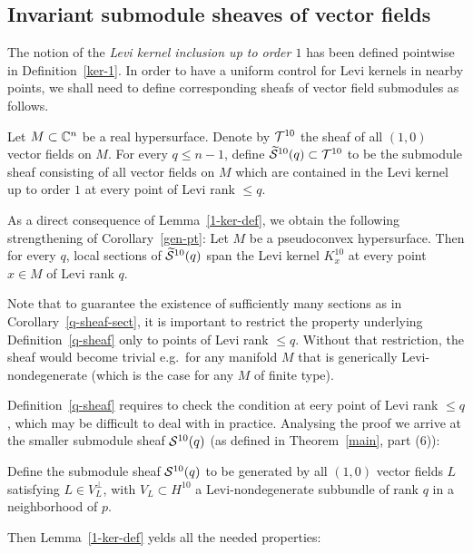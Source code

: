 \documentclass[12pt]{amsart}
\begin{document}
\subsection{Invariant submodule sheaves of vector fields}
The notion of the {\em Levi kernel inclusion up to order $1$} 
has been defined pointwise in Definition~\ref{ker-1}.
In order to have a uniform control for 
Levi kernels in nearby points,
we shall need to define
corresponding sheafs of vector field submodules as follows. 

\bd{}
Let $M\subset {\mathbb{C}}^n$ be a real hypersurface.
Denote by ${\mathcal{T}}^{10}$ the sheaf of all 
 $(1,0)$ vector fields on $M$.
For every $q\le n-1$,
define $\widetilde{{\mathcal{S}}}^{10}(q)\subset {\mathcal{T}}^{10}$ to be the submodule sheaf
consisting of all vector fields on $M$ which are
contained in the Levi kernel up to order $1$
 at every point of Levi rank $\le q$.
\ed

As a direct consequence of Lemma~\ref{1-ker-def},
we obtain the following strengthening of Corollary~\ref{gen-pt}:
\bc{}
Let $M$ be a pseudoconvex hypersurface.
Then for every $q$, local sections of $\widetilde{{\mathcal{S}}}^{10}(q)$
span the Levi kernel $K^{10}_x$
at every point $x\in M$ of Levi rank $q$.
\ec

Note that to guarantee the existence of
sufficiently many sections as in 
Corollary~\ref{q-sheaf-sect},
 it is important to restrict
the property underlying Definition~\ref{q-sheaf}
only to points of Levi rank $\le q$.
Without that restriction, 
the sheaf would become trivial
e.g.\ for any
manifold $M$ that is generically 
Levi-nondegenerate
(which is the case for any $M$ of finite type).

Definition~\ref{q-sheaf}
requires to check the condition at eery point of Levi rank $\le q$,
which may be difficult to deal with in practice.
Analysing the proof we arrive at the smaller submodule sheaf
${\mathcal{S}}^{10}(q)$ (as defined in Theorem~\ref{main}, part (6)):

\bd{}
Define the submodule sheaf ${\mathcal{S}}^{10}(q)$
to be generated by all $(1,0)$ vector fields $L$
satisfying $L\in V_L^\perp$,
with $V_L\subset H^{10}$
a Levi-nondegenerate subbundle
of rank $q$ in a neighborhood of $p$.
\ed

Then Lemma~\ref{1-ker-def} yelds all the needed properties:
\end{document}
